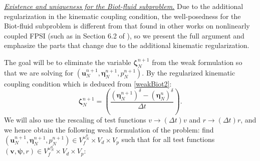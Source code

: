 \documentclass[11pt]{article}
\newcommand{\bd}{\boldsymbol}
\theoremstyle{definition}
\begin{document}
\medskip

\noindent \underline{\textit{Existence and uniqueness for the Biot-fluid subproblem.}} Due to the additional regularization in the kinematic coupling condition, the well-posedness for the Biot-fluid subproblem is different from that found in other works on nonlinearly coupled FPSI (such as in Section 6.2 of \cite{FPSIJMPA}), so we present the full argument and emphasize the parts that change due to the additional kinematic regularization. 

The goal will be to eliminate the variable $\bd{\zeta}^{n + 1}_{N}$ from the weak formulation so that we are solving for $(\bd{u}^{n + 1}_{N}, \bd{\eta}^{n + 1}_{N}, p^{n + 1}_{N})$. By the regularized kinematic coupling condition which is deduced from \eqref{weakBiot2}:
\begin{equation*}
\bd{\zeta}^{n + 1}_{N} = \left(\frac{\left(\bd{\eta}^{n + 1}_{N}\right)^{\delta} - \left(\bd{\eta}^{n}_{N}\right)^{\delta}}{\Delta t}\right).
\end{equation*}
We will also use the rescaling of test functions $v \to (\Delta t) v$ and $r \to (\Delta t) r$, and we hence obtain the following weak formulation of the problem: find $(\bd{u}^{n + 1}_{N}, \bd{\eta}^{n + 1}_{N}, p^{n + 1}_{N}) \in V^{\omega^{n}_{N}}_{f} \times V_{d} \times V_{p}$ such that for all test functions $(\bd{v}, \bd{\psi}, r) \in V^{\omega^{n}_{N}}_{f} \times V_{d} \times V_{p}$:
\end{document}
